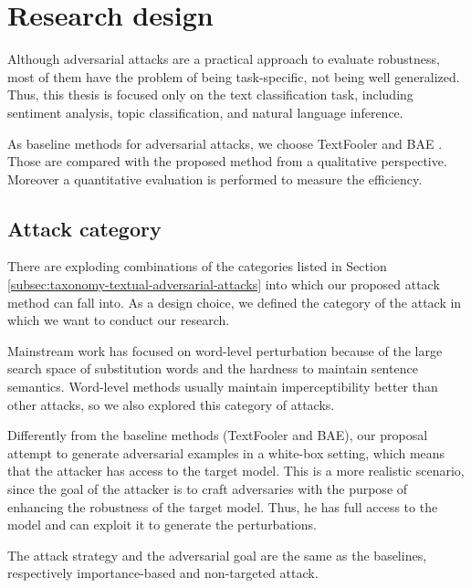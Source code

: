 \section{Research design}\label{sec:research-design}

Although adversarial attacks are a practical approach to evaluate robustness, most of them have the problem of being task-specific, not being well generalized.
Thus, this thesis is focused only on the text classification task, including sentiment analysis, topic classification, and natural language inference.

As baseline methods for adversarial attacks, we choose TextFooler \cite{journals/corr/abs-1907-11932} and BAE \cite{conf/emnlp/GargR20}.
Those are compared with the proposed method from a qualitative perspective. Moreover a quantitative evaluation is performed to measure the efficiency.

\subsection{Attack category}\label{subsec:attack-category}

There are exploding combinations of the categories listed in Section \ref{subsec:taxonomy-textual-adversarial-attacks} into which our proposed attack method can fall into.
As a design choice, we defined the category of the attack in which we want to conduct our research.

Mainstream work has focused on word-level perturbation because of the large search space of substitution words and the hardness to maintain sentence semantics. 
Word-level methods usually maintain imperceptibility better than other attacks, so we also explored this category of attacks.

Differently from the baseline methods (TextFooler and BAE), our proposal attempt to generate adversarial examples in a white-box setting, which means that the attacker has access to the target model. 
This is a more realistic scenario, since the goal of the attacker is to craft adversaries with the purpose of enhancing the robustness of the target model. 
Thus, he has full access to the model and can exploit it to generate the perturbations.

The attack strategy and the adversarial goal are the same as the baselines, respectively importance-based and non-targeted attack.

